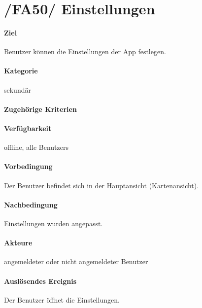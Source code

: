 \section[Einstellungen]{/FA50/ Einstellungen}
\label{/FA50/}
\paragraph{Ziel}
\Gls{Benutzer} können die Einstellungen der App festlegen.
\paragraph{Kategorie}
sekundär
\paragraph{Zugehörige Kriterien}

\paragraph{Verfügbarkeit}
\gls{offline}, alle \Glspl{Benutzer}
\paragraph{Vorbedingung}
Der \Gls{Benutzer} befindet sich in der Hauptansicht (\Gls{Kartenansicht}).
\paragraph{Nachbedingung}
Einstellungen wurden angepasst.
\paragraph{Akteure}
angemeldeter oder nicht angemeldeter \Gls{Benutzer}
\paragraph{Auslösendes Ereignis}
Der \Gls{Benutzer} öffnet die Einstellungen.
